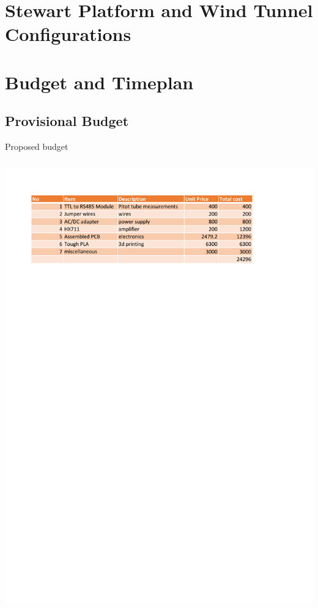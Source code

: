 \chapter*{}
 \appendix
 \chapter{Stewart Platform and Wind Tunnel Configurations}
 
 
 \chapter{Budget and Timeplan}
 \section{Provisional Budget}
 \begin{center}
 \begin{table}[!h]
 \centering
 \caption{Proposed budget}
 \paragraph{ }
 \includegraphics{Figures/budget}
 \end{table}
 \end{center}

